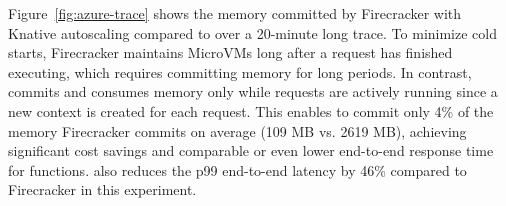 Figure~\ref{fig:azure-trace} shows the memory committed by Firecracker with Knative autoscaling compared to \dandelion over a 20-minute long trace. To minimize cold starts, Firecracker maintains MicroVMs long after a request has finished executing, which requires committing memory for long periods. In contrast, \dandelion commits and consumes memory only while requests are actively running since a new context is created for each request. This enables \dandelion to commit only 4\% of the memory Firecracker commits on average (109 MB vs. 2619 MB), achieving significant cost savings and comparable or even lower end-to-end response time for functions. 
\dandelion also reduces the p99 end-to-end latency by 46\% %
compared to Firecracker in this experiment. 
